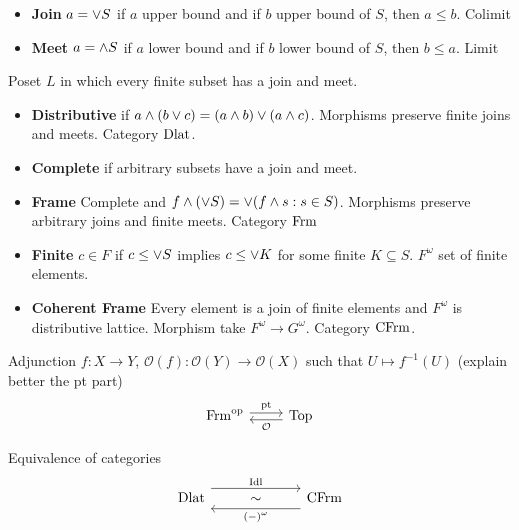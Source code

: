 \begin{definition}
\begin{itemize}[topsep=-6pt, itemsep=0pt]
    \item \textbf{Join} $a = \vee S$ if $a$ upper bound and if $b$ upper bound of $S$, then $a \leq b$. Colimit
    \item \textbf{Meet} $a = \wedge S$ if $a$ lower bound and if $b$ lower bound of $S$, then $b \leq a$. Limit
\end{itemize}
\end{definition}

\begin{definition}[Lattice] Poset $L$ in which every finite subset has a join and meet.
\begin{itemize}[topsep=-6pt, itemsep=0pt]
    \item \textbf{Distributive} if $a \wedge (b \vee c) = (a \wedge b) \vee (a \wedge c)$. Morphisms preserve finite joins and meets. Category $\operatorname{Dlat}$.
    \item \textbf{Complete} if arbitrary subsets have a join and meet.
    \item \textbf{Frame} Complete and $f \wedge (\vee S) = \vee (f \wedge s : s \in S)$. Morphisms preserve arbitrary joins and finite meets. Category $\operatorname{Frm}$ 
    \item \textbf{Finite} $c \in F$ if $c \leq \vee S$ implies $c \leq \vee K$ for some finite $K \subseteq S$. $F^{ \omega}$ set of finite elements.
    \item \textbf{Coherent Frame} Every element is a join of finite elements and $F^{\omega }$ is distributive lattice. Morphism take $F^{\omega } \to G^{\omega }$. Category $\operatorname{CFrm}$.
\end{itemize}
\end{definition}

\begin{proposition} Adjunction $f: X \to Y$, $\mathcal{O}(f) :\mathcal{O}(Y) \to \mathcal{O}(X)$ such that $U \mapsto f^{-1}(U)$ (explain better the pt part)
\[
\begin{tikzcd}
\Frm^{\text{op}} \arrow[r, shift left, "\text{pt}"] & \Top \arrow[l, shift left, "\mathcal{O}"]
\end{tikzcd}
\]
\end{proposition}

\begin{proposition} Equivalence of categories
\[\begin{tikzcd}
	{\Dlat} & \sim & {\CFrm}
	\arrow["{\Idl}", shift left=3, from=1-1, to=1-3]
	\arrow["{(-)^{\omega}}", shift left=3, from=1-3, to=1-1]
\end{tikzcd}\]
\end{proposition}

